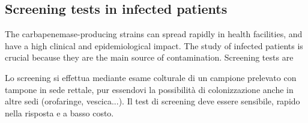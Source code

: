 \documentclass[11pt]{report}
\begin{document}
\subsection{Screening tests in infected patients}
The carbapenemase-producing strains can spread rapidly in health facilities, and have a high clinical and epidemiological impact.
The study of infected patients is crucial because they are the main source of contamination. 
Screening tests are 







Lo screening si effettua mediante esame colturale di un campione prelevato con tampone in sede
rettale, pur essendovi la possibilità di colonizzazione anche in altre sedi (orofaringe, vescica...).
Il test di screening deve essere sensibile, rapido nella risposta e a basso costo.




















\end{document}
